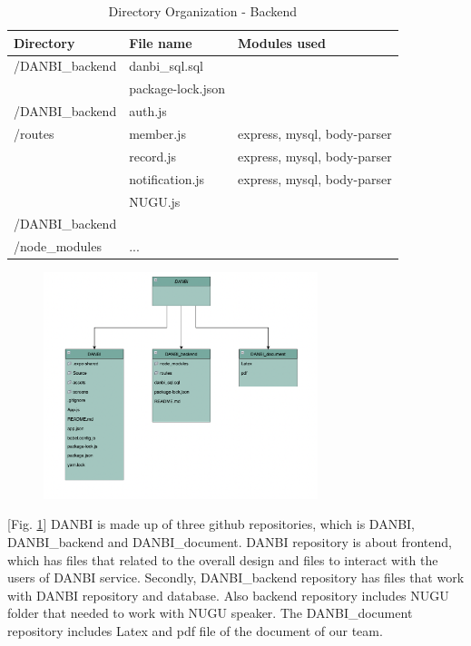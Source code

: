 \documentclass[conference]{IEEEtran}
\begin{document}
\begin{table}[h!]
        \begin{threeparttable}
            \caption{Directory Organization - Backend%
            \label{tab:table6}}    %
            \begin{tabular}{p{2.4cm}p{2.8cm}p{2cm}}
            \toprule
            \bfseries Directory & \bfseries File name & \multicolumn{1}{l}{\bfseries Modules used} \\
            \midrule
            /DANBI\_backend
            & danbi\_sql.sql \\
            & package-lock.json\\
            \hline
            /DANBI\_backend& auth.js\\
            /routes& member.js& express, mysql, body-parser\\
            & record.js& express, mysql, body-parser\\
            & notification.js& express, mysql, body-parser\\
            & NUGU.js\\
            \hline
            /DANBI\_backend\\
            /node\_modules & ...\\
            \bottomrule
            \end{tabular}
        \end{threeparttable}
    \end{table}

\par \begin{figure}[h!]
\includegraphics[width=8cm]{image/repo.png}
\centering
\caption{}
\label{fig:repo}
\end{figure}

[Fig. \ref{fig:repo}] DANBI is made up of three github repositories, which is DANBI, DANBI\_backend and DANBI\_document. DANBI repository is about frontend, which has files that related to the overall design and files to interact with the users of DANBI service. Secondly, DANBI\_backend repository has files that work with DANBI repository and database. Also backend repository includes NUGU folder that needed to work with NUGU speaker. The DANBI\_document repository includes Latex and pdf file of the document of our team.
\end{document}
